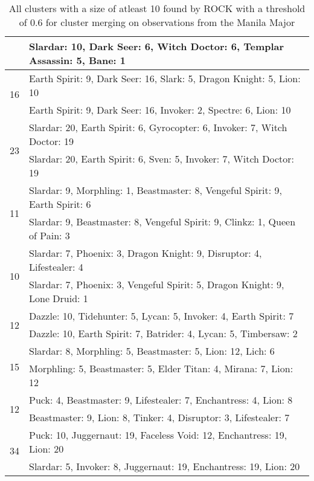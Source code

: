 \documentclass[result.tex]{subfiles}
\begin{document}
\begin{table}[H]
\begin{tabular}{ | c | p{12.5cm} | }
    & Slardar: 10, Dark Seer: 6, Witch Doctor: 6, Templar Assassin: 5, Bane: 1 \\
    \hline
    \multirow{2}{*}{16}
    & Earth Spirit: 9, Dark Seer: 16, Slark: 5, Dragon Knight: 5, Lion: 10 \\
    & Earth Spirit: 9, Dark Seer: 16, Invoker: 2, Spectre: 6, Lion: 10 \\
    \hline
    \multirow{2}{*}{23}
    & Slardar: 20, Earth Spirit: 6, Gyrocopter: 6, Invoker: 7, Witch Doctor: 19 \\
    & Slardar: 20, Earth Spirit: 6, Sven: 5, Invoker: 7, Witch Doctor: 19 \\
    \hline
    \multirow{2}{*}{11}
    & Slardar: 9, Morphling: 1, Beastmaster: 8, Vengeful Spirit: 9, Earth Spirit: 6 \\
    & Slardar: 9, Beastmaster: 8, Vengeful Spirit: 9, Clinkz: 1, Queen of Pain: 3 \\
    \hline
    \multirow{2}{*}{10}
    & Slardar: 7, Phoenix: 3, Dragon Knight: 9, Disruptor: 4, Lifestealer: 4 \\
    & Slardar: 7, Phoenix: 3, Vengeful Spirit: 5, Dragon Knight: 9, Lone Druid: 1 \\
    \hline
    \multirow{2}{*}{12}
    & Dazzle: 10, Tidehunter: 5, Lycan: 5, Invoker: 4, Earth Spirit: 7 \\
    & Dazzle: 10, Earth Spirit: 7, Batrider: 4, Lycan: 5, Timbersaw: 2 \\
    \hline
    \multirow{2}{*}{15}
    & Slardar: 8, Morphling: 5, Beastmaster: 5, Lion: 12, Lich: 6 \\
    & Morphling: 5, Beastmaster: 5, Elder Titan: 4, Mirana: 7, Lion: 12 \\
    \hline
    \multirow{2}{*}{12}
    & Puck: 4, Beastmaster: 9, Lifestealer: 7, Enchantress: 4, Lion: 8 \\
    & Beastmaster: 9, Lion: 8, Tinker: 4, Disruptor: 3, Lifestealer: 7 \\
    \hline
    \multirow{2}{*}{34}
    & Puck: 10, Juggernaut: 19, Faceless Void: 12, Enchantress: 19, Lion: 20 \\
    & Slardar: 5, Invoker: 8, Juggernaut: 19, Enchantress: 19, Lion: 20 \\
    \hline
  \end{tabular}
  \caption{All clusters with a size of atleast 10 found by ROCK with a threshold of 0.6 for cluster merging on observations from the Manila Major}
  \label{tab:cl_app_manila_rock_all}
\end{table}
\end{document}

